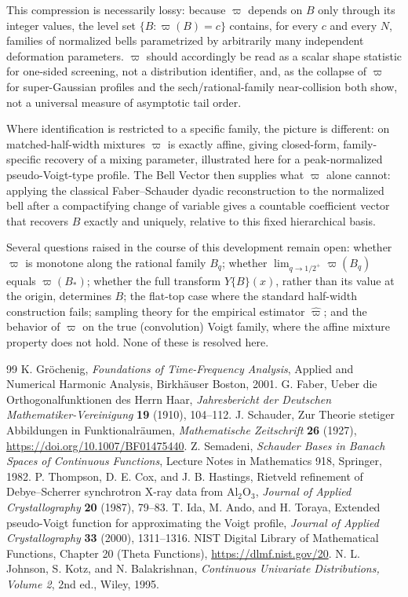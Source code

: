 \documentclass[11pt]{article}
\theoremstyle{definition}
\theoremstyle{plain}
\theoremstyle{remark}
\begin{document}
This compression is necessarily lossy: because $\varpi$ depends on $B$ only through its
integer values, the level set $\{B:\varpi(B)=c\}$ contains, for every $c$ and every
$N$, families of normalized bells parametrized by arbitrarily many independent
deformation parameters. $\varpi$ should accordingly be read as a scalar shape statistic
for one-sided screening, not a distribution identifier, and, as the collapse of
$\varpi$ for super-Gaussian profiles and the sech/rational-family near-collision both
show, not a universal measure of asymptotic tail order.

Where identification is restricted to a specific family, the picture is different: on
matched-half-width mixtures $\varpi$ is exactly affine, giving closed-form,
family-specific recovery of a mixing parameter, illustrated here for a peak-normalized
pseudo-Voigt-type profile. The Bell Vector then supplies what $\varpi$ alone cannot:
applying the classical Faber--Schauder dyadic reconstruction to the normalized bell
after a compactifying change of variable gives a countable coefficient vector that
recovers $B$ exactly and uniquely, relative to this fixed hierarchical basis.

Several questions raised in the course of this development remain open: whether
$\varpi$ is monotone along the rational family $B_q$; whether
$\lim_{q\to1/2^+}\varpi(B_q)$ equals $\varpi(B_*)$; whether the full transform
$Y\{B\}(x)$, rather than its value at the origin, determines $B$; the flat-top case
where the standard half-width construction fails; sampling theory for the empirical
estimator $\hat\varpi$; and the behavior of $\varpi$ on the true (convolution) Voigt
family, where the affine mixture property does not hold. None of these is resolved
here.

\begin{thebibliography}{99}
 K. Gr\"ochenig, \emph{Foundations of Time-Frequency Analysis},
  Applied and Numerical Harmonic Analysis, Birkh\"auser Boston, 2001.
 G. Faber, Ueber die Orthogonalfunktionen des Herrn Haar,
  \emph{Jahresbericht der Deutschen Mathematiker-Vereinigung} \textbf{19} (1910), 104--112.
 J. Schauder, Zur Theorie stetiger Abbildungen in Funktionalr\"aumen,
  \emph{Mathematische Zeitschrift} \textbf{26} (1927), \url{https://doi.org/10.1007/BF01475440}.
 Z. Semadeni, \emph{Schauder Bases in Banach Spaces of Continuous
  Functions}, Lecture Notes in Mathematics 918, Springer, 1982.
 P. Thompson, D. E. Cox, and J. B. Hastings, Rietveld refinement of
  Debye--Scherrer synchrotron X-ray data from Al$_2$O$_3$,
  \emph{Journal of Applied Crystallography} \textbf{20} (1987), 79--83.
 T. Ida, M. Ando, and H. Toraya, Extended pseudo-Voigt
  function for approximating the Voigt profile,
  \emph{Journal of Applied Crystallography} \textbf{33} (2000), 1311--1316.
 NIST Digital Library of Mathematical Functions, Chapter 20 (Theta
  Functions), \url{https://dlmf.nist.gov/20}.
 N. L. Johnson, S. Kotz, and N. Balakrishnan,
  \emph{Continuous Univariate Distributions, Volume 2}, 2nd ed., Wiley, 1995.
\end{thebibliography}
\end{document}
